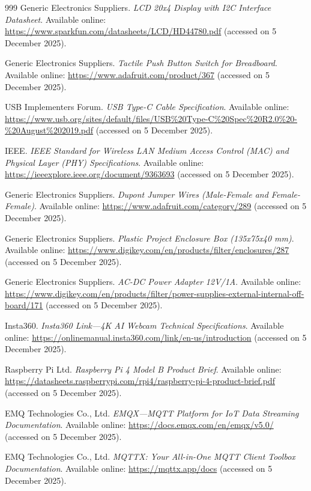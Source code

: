 \documentclass[sensors,article,submit,pdftex]{Definitions/mdpi}
\begin{document}
\begin{thebibliography}{999}
Generic Electronics Suppliers.
\textit{LCD 20x4 Display with I2C Interface Datasheet}.
Available online: \url{https://www.sparkfun.com/datasheets/LCD/HD44780.pdf} (accessed on 5 December 2025).

Generic Electronics Suppliers.
\textit{Tactile Push Button Switch for Breadboard}.
Available online: \url{https://www.adafruit.com/product/367} (accessed on 5 December 2025).

USB Implementers Forum.
\textit{USB Type-C Cable Specification}.
Available online: \url{https://www.usb.org/sites/default/files/USB\%20Type-C\%20Spec\%20R2.0\%20-\%20August\%202019.pdf} (accessed on 5 December 2025).

IEEE.
\textit{IEEE Standard for Wireless LAN Medium Access Control (MAC) and Physical Layer (PHY) Specifications}.
Available online: \url{https://ieeexplore.ieee.org/document/9363693} (accessed on 5 December 2025).

Generic Electronics Suppliers.
\textit{Dupont Jumper Wires (Male-Female and Female-Female)}.
Available online: \url{https://www.adafruit.com/category/289} (accessed on 5 December 2025).

Generic Electronics Suppliers.
\textit{Plastic Project Enclosure Box (135x75x40 mm)}.
Available online: \url{https://www.digikey.com/en/products/filter/enclosures/287} (accessed on 5 December 2025).

Generic Electronics Suppliers.
\textit{AC-DC Power Adapter 12V/1A}.
Available online: \url{https://www.digikey.com/en/products/filter/power-supplies-external-internal-off-board/171} (accessed on 5 December 2025).

Insta360.
\textit{Insta360 Link---4K AI Webcam Technical Specifications}.
Available online: \url{https://onlinemanual.insta360.com/link/en-us/introduction} (accessed on 5 December 2025).

Raspberry Pi Ltd.
\textit{Raspberry Pi 4 Model B Product Brief}.
Available online: \url{https://datasheets.raspberrypi.com/rpi4/raspberry-pi-4-product-brief.pdf} (accessed on 5 December 2025).

EMQ Technologies Co., Ltd.
\textit{EMQX---MQTT Platform for IoT Data Streaming Documentation}.
Available online: \url{https://docs.emqx.com/en/emqx/v5.0/} (accessed on 5 December 2025).

EMQ Technologies Co., Ltd.
\textit{MQTTX: Your All-in-One MQTT Client Toolbox Documentation}.
Available online: \url{https://mqttx.app/docs} (accessed on 5 December 2025).


\end{thebibliography}
\end{document}
